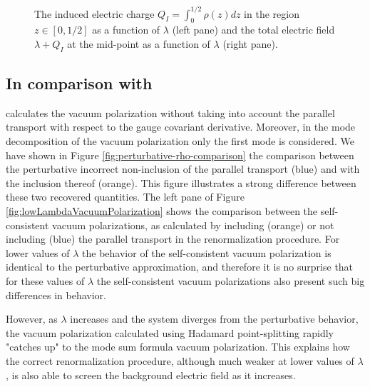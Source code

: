 \begin{figure}
\begin{subfigure}{0.5\textwidth}
\end{subfigure}
\caption{The induced electric charge $Q_I = \int_0^{1/2}\rho(z)dz$ in the region $z\in[0,1/2]$ as a function of $\lambda$ (left pane) and the total electric field $\lambda + Q_I$ at the mid-point as a function of $\lambda$ (right pane).  }
\label{fig:induced-charge}
\end{figure}\subsection{In comparison with \cite{Ambj1983}}

\cite{Ambj1983} calculates the vacuum polarization without taking into account the parallel transport with respect to the gauge covariant derivative. Moreover, in the mode decomposition of the vacuum polarization only the first mode is considered. We have shown in Figure \ref{fig:perturbative-rho-comparison} the comparison between the perturbative incorrect non-inclusion of the parallel transport (blue) and with the inclusion thereof (orange). This figure illustrates a strong difference between these two recovered quantities. The left pane of Figure \ref{fig:lowLambdaVacuumPolarization} shows the comparison between the self-consistent vacuum polarizations, as calculated by including (orange) or not including (blue) the parallel transport in the renormalization procedure. For lower values of $\lambda$ the behavior of the self-consistent vacuum polarization is identical to the perturbative approximation, and therefore it is no surprise that for these values of $\lambda$ the self-consistent vacuum polarizations also present such big differences in behavior. 

However, as $\lambda$ increases and the system diverges from the perturbative behavior, the vacuum polarization calculated using Hadamard point-splitting rapidly "catches up" to the mode sum formula vacuum polarization. This explains how the correct renormalization procedure, although much weaker at lower values of $\lambda$, is also able to screen the background electric field as it increases.


